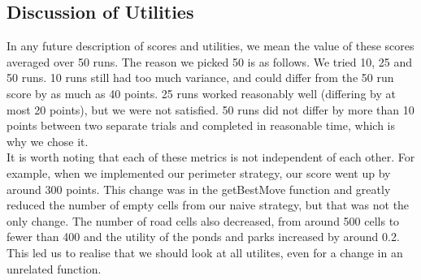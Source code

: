 \subsection{Discussion of Utilities}
In any future description of scores and utilities, we mean the value of these scores averaged over 50 runs. The reason we picked 50 is as follows. We tried 10, 25 and 50 runs. 10 runs still had too much variance, and could differ from the 50 run score by as much as 40 points. 25 runs worked reasonably well (differing by at most 20 points), but we were not satisfied. 50 runs did not differ by more than 10 points between two separate trials and completed in reasonable time, which is why we chose it.
\\
It is worth noting that each of these metrics is not independent of each other. For example, when we implemented our perimeter strategy, our score went up by around 300 points. This change was in the getBestMove function and greatly reduced the number of empty cells from our naive strategy, but that was not the only change. The number of road cells also decreased, from around 500 cells to fewer than 400 and the utility of the ponds and parks increased by around 0.2. This led us to realise that we should look at all utilites, even for a change in an unrelated function.
\\
